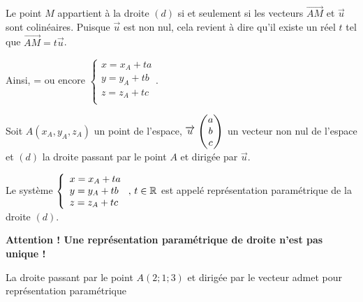 \documentclass[11pt,fleqn, openany]{book} %
\begin{document}
\begin{demonstration} Le point $M$ appartient à la droite $(d)$ si et seulement si les vecteurs $\overrightarrow{AM}$ et $\vec u$ sont colinéaires. Puisque $\vec u$ est non nul, cela revient à dire qu'il existe un réel $t$ tel que $\overrightarrow{AM}=t \vec u$.


Ainsi, \renewcommand{\arraystretch}{1} = \renewcommand{\arraystretch}{1} ou encore $\left\{ \begin{array}{l}x=x_A+ta \\ y=y_A+tb \\ z = z_A + tc \\

\end{array}\right.$.\end{demonstration}

\begin{definition}Soit $A (x_A,y_A,z_A)$ un point de l'espace, $\renewcommand{\arraystretch}{1}\coorde{u}{a}{b}{c}$ un vecteur non nul de l'espace et $(d)$ la droite passant par le point $A$ et dirigée par $\vec u$.

Le système $ \left\{ \renewcommand{\arraystretch}{1}\begin{array}{l}x=x_A+ta \\ y=y_A+tb \\ z = z_A + tc \\

\end{array}\right.,\,t\in\mathbb{R}$ est appelé représentation paramétrique de la droite $(d)$.

\end{definition}

\textbf{Attention ! Une représentation paramétrique de droite n'est pas unique !}
\newpage
\begin{example} La droite passant par le point $A(2;1;3)$ et dirigée par le vecteur \renewcommand{\arraystretch}{1} admet pour représentation paramétrique 
\vskip30pt
\end{example}
\end{document}
